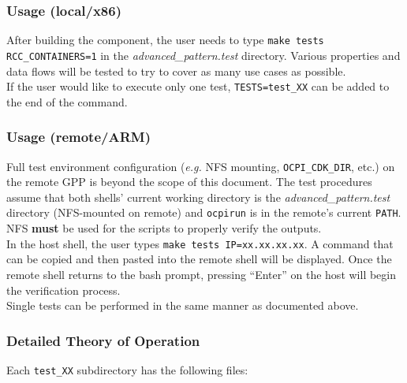 \documentclass{article}
\begin{document}
\subsubsection*{Usage (local/x86)}
After building the component, the user needs to type \verb+make tests RCC_CONTAINERS=1+ in the \textit{advanced\_pattern.test} directory. Various properties and data flows will be tested to try to cover as many use cases as possible. \\

If the user would like to execute only one test, \verb+TESTS=test_XX+ can be added to the end of the command.
\subsubsection*{Usage (remote/ARM)}
Full test environment configuration (\textit{e.g.} NFS mounting, \verb+OCPI_CDK_DIR+, etc.) on the remote GPP is beyond the scope of this document. The test procedures assume that both shells' current working directory is the \textit{advanced\_pattern.test} directory (NFS-mounted on remote) and \verb+ocpirun+ is in the remote's current \verb+PATH+. NFS \textbf{must} be used for the scripts to properly verify the outputs. \\

In the host shell, the user types \verb+make tests IP=xx.xx.xx.xx+. A command that can be copied and then pasted into the remote shell will be displayed. Once the remote shell returns to the bash prompt, pressing ``Enter'' on the host will begin the verification process. \\

Single tests can be performed in the same manner as documented above.

\subsubsection*{Detailed Theory of Operation}
Each \verb+test_XX+ subdirectory has the following files:
\end{document}
